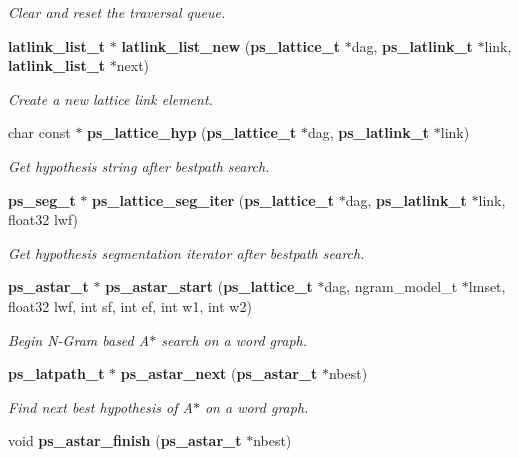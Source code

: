 \begin{DoxyCompactItemize}
\begin{DoxyCompactList}\small\item\em Clear and reset the traversal queue. \end{DoxyCompactList}\item 
{\bf latlink\+\_\+list\+\_\+t} $\ast$ {\bf latlink\+\_\+list\+\_\+new} ({\bf ps\+\_\+lattice\+\_\+t} $\ast$dag, {\bf ps\+\_\+latlink\+\_\+t} $\ast$link, {\bf latlink\+\_\+list\+\_\+t} $\ast$next)\label{ps__lattice__internal_8h_a7197508af770064ea825bb812dd6eddc}

\begin{DoxyCompactList}\small\item\em Create a new lattice link element. \end{DoxyCompactList}\item 
char const $\ast$ {\bf ps\+\_\+lattice\+\_\+hyp} ({\bf ps\+\_\+lattice\+\_\+t} $\ast$dag, {\bf ps\+\_\+latlink\+\_\+t} $\ast$link)\label{ps__lattice__internal_8h_a02b07c009d23b852bd4db54700dfac5b}

\begin{DoxyCompactList}\small\item\em Get hypothesis string after bestpath search. \end{DoxyCompactList}\item 
{\bf ps\+\_\+seg\+\_\+t} $\ast$ {\bf ps\+\_\+lattice\+\_\+seg\+\_\+iter} ({\bf ps\+\_\+lattice\+\_\+t} $\ast$dag, {\bf ps\+\_\+latlink\+\_\+t} $\ast$link, float32 lwf)\label{ps__lattice__internal_8h_afedbc5558c18f7d029e84a4e27e38187}

\begin{DoxyCompactList}\small\item\em Get hypothesis segmentation iterator after bestpath search. \end{DoxyCompactList}\item 
{\bf ps\+\_\+astar\+\_\+t} $\ast$ {\bf ps\+\_\+astar\+\_\+start} ({\bf ps\+\_\+lattice\+\_\+t} $\ast$dag, ngram\+\_\+model\+\_\+t $\ast$lmset, float32 lwf, int sf, int ef, int w1, int w2)
\begin{DoxyCompactList}\small\item\em Begin N-\/\+Gram based A$\ast$ search on a word graph. \end{DoxyCompactList}\item 
{\bf ps\+\_\+latpath\+\_\+t} $\ast$ {\bf ps\+\_\+astar\+\_\+next} ({\bf ps\+\_\+astar\+\_\+t} $\ast$nbest)
\begin{DoxyCompactList}\small\item\em Find next best hypothesis of A$\ast$ on a word graph. \end{DoxyCompactList}\item 
void {\bf ps\+\_\+astar\+\_\+finish} ({\bf ps\+\_\+astar\+\_\+t} $\ast$nbest)\label{ps__lattice__internal_8h_abfb03e9e0fcbe3def45120f5ba43be14}


\end{DoxyCompactItemize}
